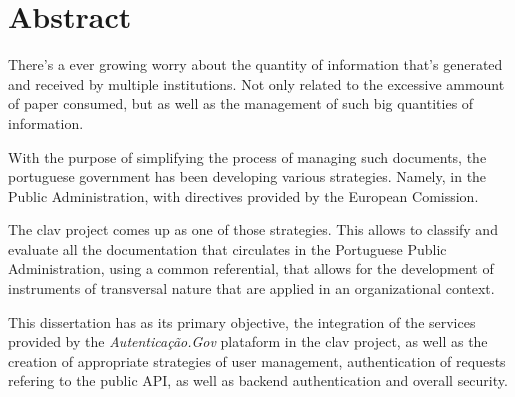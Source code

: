 \chapter*{Abstract}

There's a ever growing worry about the quantity of information that's generated and received by multiple institutions. Not only related to the excessive ammount of paper consumed, but as well as the management of such big quantities of information.

With the purpose of simplifying the process of managing such documents, the portuguese government has been developing various strategies. Namely, in the Public Administration, with directives provided by the European Comission.

The \gls{clav} project comes up as one of those strategies. This allows to classify and evaluate all the documentation that circulates in the Portuguese Public Administration, using a common referential, that allows for the development of instruments of transversal nature that are applied in an organizational context.

This dissertation has as its primary objective, the integration of the services provided by the \emph{Autenticação.Gov} plataform in the \gls{clav} project, as well as the creation of appropriate strategies of user management, authentication of requests refering to the public API, as well as  backend authentication and overall security.

\vspace{5cm}
